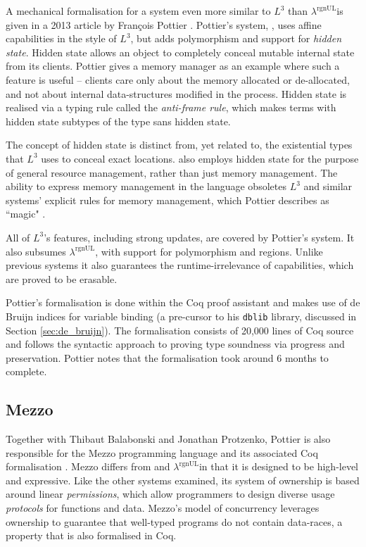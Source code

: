 \documentclass[]{unswthesis}
\newcommand{\rgnUL}{$\lambda^\text{rgnUL}$\text{ }}
\newcommand{\SSPHS}{\text{SSPHS }}
\newcommand{\Francois}{Fran\frenchc{c}ois }
\let\frenchc\c
\let\c\texttt
\let\i\textit
\begin{document}
A mechanical formalisation for a system even more similar to $L^3$ than \rgnUL is given in a 2013 article by \Francois Pottier \cite{pottier13}. Pottier's system, \SSPHS, uses affine capabilities in the style of $L^3$, but adds polymorphism and support for \i{hidden state}. Hidden state allows an object to completely conceal mutable internal state from its clients. Pottier gives a memory manager as an example where such a feature is useful -- clients care only about the memory allocated or de-allocated, and not about internal data-structures modified in the process. Hidden state is realised via a typing rule called the \i{anti-frame rule}, which makes terms with hidden state subtypes of the type sans hidden state.

The concept of hidden state is distinct from, yet related to, the existential types that $L^3$ uses to conceal exact locations. \SSPHS also employs hidden state for the purpose of general resource management, rather than just memory management. The ability to express memory management in the language obsoletes $L^3$ and similar systems' explicit rules for memory management, which Pottier describes as ``magic" \cite{pottier13}.

All of $L^3$'s features, including strong updates, are covered by Pottier's system. It also subsumes \rgnUL, with support for polymorphism and regions. Unlike previous systems it also guarantees the runtime-irrelevance of capabilities, which are proved to be erasable.

Pottier's formalisation is done within the Coq proof assistant and makes use of de Bruijn indices for variable binding (a pre-cursor to his \c{dblib} library, discussed in Section \ref{sec:de_bruijn}). The formalisation consists of 20,000 lines of Coq source and follows the syntactic approach to proving type soundness via progress and preservation. Pottier notes that the formalisation took around 6 months to complete.

\subsection{Mezzo}

Together with Thibaut Balabonski and Jonathan Protzenko, Pottier is also responsible for the Mezzo programming language and its associated Coq formalisation \cite{mezzo14}. Mezzo differs from \SSPHS and \rgnUL in that it is designed to be high-level and expressive. Like the other systems examined, its system of ownership is based around linear \i{permissions}, which allow programmers to design diverse usage \i{protocols} for functions and data. Mezzo's model of concurrency leverages ownership to guarantee that well-typed programs do not contain data-races, a property that is also formalised in Coq.
\end{document}
